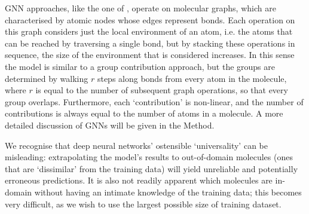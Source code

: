 GNN approaches, like the one of \citet{qinPredictingCriticalMicelle2021},
operate on molecular graphs, which are characterised by atomic nodes whose edges
represent bonds. Each operation on this graph considers just the local
environment of an atom, i.e. the atoms that can be reached by traversing a
single bond, but by stacking these operations in sequence, the size of the
environment that is considered increases. In this sense the model is similar to
a group contribution approach, but the groups are determined by walking $r$
steps along bonds from every atom in the molecule, where $r$ is equal to the
number of subsequent graph operations, so that every group overlaps.
Furthermore, each `contribution' is non-linear, and the number of contributions
is always equal to the number of atoms in a molecule. A more detailed discussion
of GNNs will be given in the Method.

We recognise that deep neural networks' ostensible `universality' can be
misleading: extrapolating the model's results to out-of-domain molecules (ones
that are `dissimilar' from the training data) will yield unreliable and
potentially erroneous predictions. It is also not readily apparent which
molecules are in-domain without having an intimate knowledge of the training
data; this becomes very difficult, as we wish to use the largest possible size
of training dataset.
